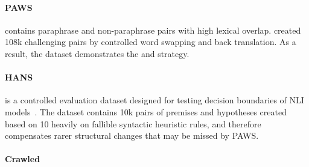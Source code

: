 \paragraph{PAWS} contains paraphrase and non-paraphrase pairs with high lexical overlap. 
\citet{zhang2019paws} created 108k challenging pairs by controlled word swapping and back translation.
As a result, the dataset demonstrates the  and  strategy.


\paragraph{HANS} is a controlled evaluation dataset designed for testing decision boundaries of NLI models~\cite{mccoy2019right}. 
The dataset contains 10k pairs of premises and hypotheses created based on 10 heavily on fallible syntactic heuristic rules, and therefore compensates rarer structural changes that may be missed by PAWS.


\paragraph{Crawled} 


